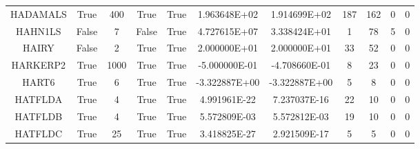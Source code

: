 \begin{longtable}{ccccccccccc}
	\cellcolor{default1} HADAMALS& \cellcolor{default1} True& \cellcolor{default1} 400& \cellcolor{default1} True& \cellcolor{default1} True& \cellcolor{poor} 1.963648E+02& \cellcolor{best} 1.914699E+02& \cellcolor{ok} 187& \cellcolor{best} 162& \cellcolor{default1} 0& \cellcolor{default1} 0\\
	\cellcolor{default2} HAHN1LS& \cellcolor{default2} False& \cellcolor{default2} 7& \cellcolor{default2} False& \cellcolor{default2} True& \cellcolor{poor} 4.727615E+07& \cellcolor{best} 3.338424E+01& \cellcolor{best} 1& \cellcolor{poor} 78& \cellcolor{default2} 5& \cellcolor{default2} 0\\
	\cellcolor{default1} HAIRY& \cellcolor{default1} False& \cellcolor{default1} 2& \cellcolor{default1} True& \cellcolor{default1} True& \cellcolor{best} 2.000000E+01& \cellcolor{best} 2.000000E+01& \cellcolor{best} 33& \cellcolor{ok} 52& \cellcolor{default1} 0& \cellcolor{default1} 0\\
	\cellcolor{default2} HARKERP2& \cellcolor{default2} True& \cellcolor{default2} 1000& \cellcolor{default2} True& \cellcolor{default2} True& \cellcolor{best} -5.000000E-01& \cellcolor{poor} -4.708660E-01& \cellcolor{best} 8& \cellcolor{poor} 23& \cellcolor{default2} 0& \cellcolor{default2} 0\\
	\cellcolor{default1} HART6& \cellcolor{default1} True& \cellcolor{default1} 6& \cellcolor{default1} True& \cellcolor{default1} True& \cellcolor{ok} -3.322887E+00& \cellcolor{best} -3.322887E+00& \cellcolor{best} 5& \cellcolor{ok} 8& \cellcolor{default1} 0& \cellcolor{default1} 0\\
	\cellcolor{default2} HATFLDA& \cellcolor{default2} True& \cellcolor{default2} 4& \cellcolor{default2} True& \cellcolor{default2} True& \cellcolor{best} 4.991961E-22& \cellcolor{ok} 7.237037E-16& \cellcolor{poor} 22& \cellcolor{best} 10& \cellcolor{default2} 0& \cellcolor{default2} 0\\
	\cellcolor{default1} HATFLDB& \cellcolor{default1} True& \cellcolor{default1} 4& \cellcolor{default1} True& \cellcolor{default1} True& \cellcolor{best} 5.572809E-03& \cellcolor{ok} 5.572812E-03& \cellcolor{ok} 19& \cellcolor{best} 10& \cellcolor{default1} 0& \cellcolor{default1} 0\\
	\cellcolor{default2} HATFLDC& \cellcolor{default2} True& \cellcolor{default2} 25& \cellcolor{default2} True& \cellcolor{default2} True& \cellcolor{best} 3.418825E-27& \cellcolor{ok} 2.921509E-17& \cellcolor{best} 5& \cellcolor{best} 5& \cellcolor{default2} 0& \cellcolor{default2} 0\\

\end{longtable}
